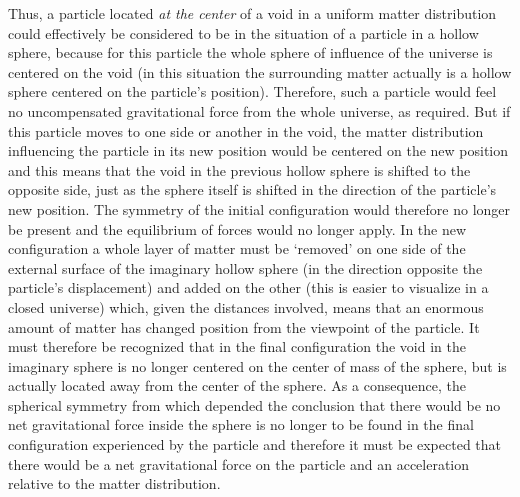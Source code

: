 \documentclass[notitlepage,12pt]{report}
\begin{document}
Thus, a particle located \textit{at the center} of a void in a uniform matter distribution could effectively be considered to be in the situation of a particle in a hollow sphere, because for this particle the whole sphere of influence of the universe is centered on the void (in this situation the surrounding matter actually is a hollow sphere centered on the particle's position). Therefore, such a particle would feel no uncompensated gravitational force from the whole universe, as required. But if this particle moves to one side or another in the void, the matter distribution influencing the particle in its new position would be centered on the new position and this means that the void in the previous hollow sphere is shifted to the opposite side, just as the sphere itself is shifted in the direction of the particle's new position. The symmetry of the initial configuration would therefore no longer be present and the equilibrium of forces would no longer apply. In the new configuration a whole layer of matter must be `removed' on one side of the external surface of the imaginary hollow sphere (in the direction opposite the particle's displacement) and added on the other (this is easier to visualize in a closed universe) which, given the distances involved, means that an enormous amount of matter has changed position from the viewpoint of the particle. It must therefore be recognized that in the final configuration the void in the imaginary sphere is no longer centered on the center of mass of the sphere, but is actually located away from the center of the sphere. As a consequence, the spherical symmetry from which depended the conclusion that there would be no net gravitational force inside the sphere is no longer to be found in the final configuration experienced by the particle and therefore it must be expected that there would be a net gravitational force on the particle and an acceleration relative to the matter distribution.
\end{document}
